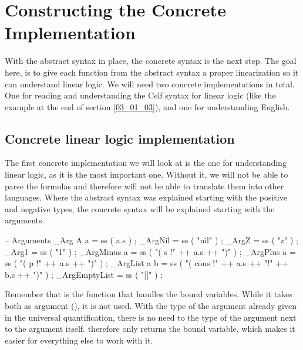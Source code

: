 \section{Constructing the Concrete Implementation}
\label{04_02}

With the abstract syntax in place, the concrete syntax is the next step. The goal here, is to give each function from the abstract syntax a proper linearization so it can understand linear logic. We will need two concrete implementations in total. One for reading and understanding the Celf syntax for linear logic (like the example at the end of section \ref{03_01_03}), and one for understanding English.

\subsection{Concrete linear logic implementation}
\label{04_02_01}

The first concrete implementation we will look at is the one for understanding linear logic, as it is the most important one. Without it, we will not be able to parse the formulas and therefore will not be able to translate them into other languages. Where the abstract syntax was explained starting with the positive and negative types, the concrete syntax will be explained starting with the arguments.

\begin{lstgf}
        -- Arguments
        _Arg A a                        = ss ( a.s ) ;
        _ArgNil                         = ss ( "nil" ) ;
        _ArgZ                           = ss ( "z" ) ;
        _Arg1                           = ss ( "1" ) ;
        _ArgMinus a                     = ss ( "( s !" ++ a.s ++ ")" ) ;
        _ArgPlus a                      = ss ( "( p !" ++ a.s ++ ")" ) ;
        _ArgList a b                    = ss ( "( cons !" ++ a.s ++ "!" ++ b.s ++ ")" ) ;
        _ArgEmptyList                   = ss ( "[]" ) ;
\end{lstgf}

Remember that  is the function that handles the bound variables. While it takes both as argument (), it is not used. With the type of the argument already given in the universal quantification, there is no need to the type of the argument next to the argument itself.  therefore only returns the bound variable, which makes it easier for everything else to work with it.

